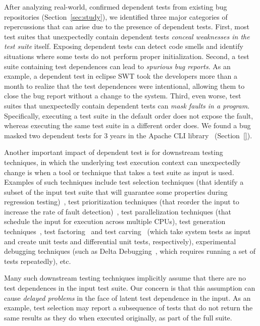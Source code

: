 After analyzing  real-world, confirmed dependent
tests from existing bug repositories (Section~\ref{sec:study}), we identified three
major categories of repercussions that can arise due to the presence of dependent tests.
First, most test suites that unexpectedly contain dependent tests \emph{conceal
weaknesses in the test suite} itself. Exposing
dependent tests can detect code smells and identify situations
where some tests do not perform proper initialization.
Second, a test suite containing test dependences can lead
to \emph{spurious bug reports}. As an example, a dependent test in
eclipse SWT took the developers
more than a month to realize that the test dependences were intentional,
allowing them to close the bug report without a change to the system.
Third, even worse, test suites that unexpectedly contain dependent tests can
\emph{mask faults in a program}. Specifically, executing a test suite in the
default order does not expose the fault, whereas
executing the same test suite in a different order does. We found 
a bug masked two dependent tests
for 3 years in the Apache CLI library~\cite{cli} (Section~\ref{}).


Another important impact of dependent test is for downstream testing
techniques, in which the underlying test execution context can
unexpectedly change is when a tool or technique that takes a test
suite as input is used.  Examples of such techniques include
test selection techniques (that identify a subset of
the input test suite that will guarantee some properties during
regression testing)~\cite{harroldetal:OOPSLA:2001},
test prioritization techniques (that reorder the
input to increase the rate of fault detection)~\cite{Elbaum:2000:PTC:347324.348910},
test parallelization techniques (that schedule the input for execution across multiple
CPUs), test generation techniques~\cite{PachecoLET2007, SPLAT},
test factoring~\cite{Saff:2005} and test carving~\cite{Elbaum:2006} (which take system tests as
input and create unit tests and differential unit tests,
respectively), experimental debugging techniques (such as Delta Debugging~\cite{Zeller:2002},
which requires running a set of tests repeatedly), etc. 

Many such downstream testing techniques implicitly assume that
there are no test dependences in the input test suite.  Our concern is
that this assumption can cause \emph{delayed problems} in the face
of latent test dependence in the input.  As an
example, test selection may report a subsequence of tests that do not
return the same results as they do when executed originally, as part of the full suite.

